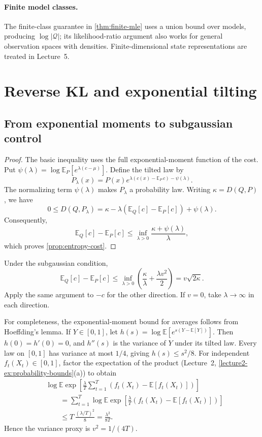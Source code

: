 \documentclass[11pt,twoside]{article}
\newcommand{\E}{\mathbb E}
\newcommand{\KL}{D}
\theoremstyle{definition}
\theoremstyle{remark}
\begin{document}
\paragraph{Finite model classes.}
The finite-class guarantee in \cref{thm:finite-mle} uses a union bound
over models, producing \(\log|\mathcal Q|\); its likelihood-ratio
argument also works for general observation spaces with densities.
Finite-dimensional state representations are treated in Lecture~5.

\clearpage


\section{Reverse KL and exponential tilting}
\label{app:reverse-proof}

\subsection{From exponential moments to subgaussian control}

\entropycost*
\begin{proof}
The basic inequality uses the full exponential-moment function of the
cost. Put
\(\psi(\lambda)=\log\E_P[e^{\lambda(c-\mu)}]\).
Define the tilted law by
\[
 P_\lambda(x)=P(x)e^{\lambda(c(x)-\E_P\,c)-\psi(\lambda)}.
\]
The normalizing term $\psi(\lambda)$ makes $P_\lambda$ a probability law.
Writing \(\kappa=\KL(Q, P)\), we have
\[
 0\le\KL(Q, P_\lambda)
 =\kappa-\lambda(\E_Q[c]-\E_P[c])+\psi(\lambda).
\]
Consequently,
\[
 \E_Q[c]-\E_P[c]
 \le\inf_{\lambda>0}\frac{\kappa+\psi(\lambda)}{\lambda},
\]
which proves \cref{prop:entropy-cost}.
\end{proof}

Under the subgaussian condition,
\[
 \E_Q[c]-\E_P[c]
 \le\inf_{\lambda>0}
 \left(\frac{\kappa}{\lambda}+\frac{\lambda v^2}2\right)
 =v\sqrt{2\kappa}.
\]
Apply the same argument to \(-c\) for the other direction.
If \(v=0\), take \(\lambda\to\infty\) in each direction.

For completeness, the exponential-moment bound for averages follows
from Hoeffding's lemma. If \(Y\in[0,1]\), let
\(h(s)=\log\E[e^{s(Y-\E[Y])}]\).
Then \(h(0)=h'(0)=0\), and \(h''(s)\) is the variance of \(Y\)
under its tilted law. Every law on \([0,1]\) has variance at most
\(1/4\), giving \(h(s)\le s^2/8\).
For independent \(f_t(X_t)\in[0,1]\), factor the expectation of the
product (Lecture~2, \cref{lecture2-ex:probability-bounds}(a)) to obtain
\begin{align*}
 &\log\E\exp\left[
 \frac{\lambda}{T}\sum_{t=1}^T
 (f_t(X_t)-\E[f_t(X_t)])\right]\\
 &\qquad=\sum_{t=1}^T\log\E\exp\left[
 \frac{\lambda}{T}(f_t(X_t)-\E[f_t(X_t)])\right]\\
 &\qquad\le T\,\frac{(\lambda/T)^2}{8}
 =\frac{\lambda^2}{8T}.
\end{align*}
Hence the variance proxy is \(v^2=1/(4T)\).
\end{document}
